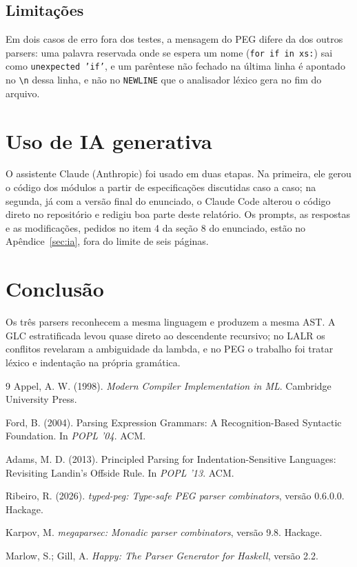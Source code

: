 \documentclass[12pt,a4paper]{article}
\begin{document}
\subsection{Limitações}

Em dois casos de erro fora dos testes, a mensagem do PEG difere da dos
outros parsers: uma palavra
reservada onde se espera um nome (\texttt{for if in xs:}) sai como
\texttt{unexpected 'if'}, e um parêntese não fechado na última linha é
apontado no \texttt{\textbackslash n} dessa linha, e não no
\texttt{NEWLINE} que o analisador léxico gera no fim do arquivo.

\section{Uso de IA generativa}
\label{sec:usoia}

O assistente Claude (Anthropic) foi usado em duas etapas. Na primeira, ele
gerou o código dos módulos a partir de especificações discutidas caso a
caso; na segunda, já com a versão final do enunciado, o Claude Code alterou
o código direto no repositório e redigiu boa parte deste relatório. Os
prompts, as respostas e as modificações, pedidos no item 4 da seção 8 do
enunciado, estão no Apêndice~\ref{sec:ia}, fora do limite de seis páginas.

\section{Conclusão}

Os três parsers reconhecem a mesma linguagem e produzem a mesma AST. A
GLC estratificada levou quase direto ao descendente recursivo; no LALR
os conflitos revelaram a ambiguidade da lambda, e no PEG o trabalho foi
tratar léxico e indentação na própria gramática.

\begin{thebibliography}{9}
\setlength{\itemsep}{0pt}
Appel, A. W. (1998). \emph{Modern Compiler Implementation in ML}. Cambridge University Press.

Ford, B. (2004). Parsing Expression Grammars: A Recognition-Based Syntactic Foundation. In \emph{POPL '04}. ACM.

Adams, M. D. (2013). Principled Parsing for Indentation-Sensitive Languages: Revisiting Landin's Offside Rule. In \emph{POPL '13}. ACM.

Ribeiro, R. (2026). \emph{typed-peg: Type-safe PEG parser combinators}, versão 0.6.0.0. Hackage.

Karpov, M. \emph{megaparsec: Monadic parser combinators}, versão 9.8. Hackage.

Marlow, S.; Gill, A. \emph{Happy: The Parser Generator for Haskell}, versão 2.2.
\end{thebibliography}

\clearpage
\appendix

\end{document}
